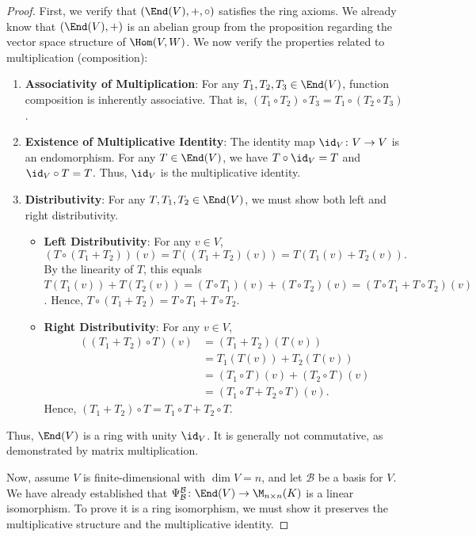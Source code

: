 \begin{proof}
  First, we verify that $(\End(V), +, \circ)$ satisfies the ring axioms. We already know that $(\End(V), +)$ is an abelian group from the proposition regarding the vector space structure of $\Hom(V,W)$. We now verify the properties related to multiplication (composition):
  \begin{enumerate}
    \item \textbf{Associativity of Multiplication}: For any $T_1, T_2, T_3 \in \End(V)$, function composition is inherently associative. That is, $(T_1 \circ T_2) \circ T_3 = T_1 \circ (T_2 \circ T_3)$.
    \item \textbf{Existence of Multiplicative Identity}: The identity map $\id_V \colon V \to V$ is an endomorphism. For any $T \in \End(V)$, we have $T \circ \id_V = T$ and $\id_V \circ T = T$. Thus, $\id_V$ is the multiplicative identity.
    \item \textbf{Distributivity}: For any $T, T_1, T_2 \in \End(V)$, we must show both left and right distributivity.
    \begin{itemize}
      \item \textbf{Left Distributivity}: For any $v \in V$,
      \[ (T \circ (T_1 + T_2))(v) = T((T_1 + T_2)(v)) = T(T_1(v) + T_2(v)). \]
      By the linearity of $T$, this equals $T(T_1(v)) + T(T_2(v)) = (T \circ T_1)(v) + (T \circ T_2)(v) = (T \circ T_1 + T \circ T_2)(v)$.
      Hence, $T \circ (T_1 + T_2) = T \circ T_1 + T \circ T_2$.
      \item \textbf{Right Distributivity}: For any $v \in V$,
      \begin{align*}
        ((T_1 + T_2) \circ T)(v) &= (T_1 + T_2)(T(v)) \\
        &= T_1(T(v)) + T_2(T(v)) \\
        &= (T_1 \circ T)(v) + (T_2 \circ T)(v) \\
        &= (T_1 \circ T + T_2 \circ T)(v).
      \end{align*}
      Hence, $(T_1 + T_2) \circ T = T_1 \circ T + T_2 \circ T$.
    \end{itemize}
  \end{enumerate}
  Thus, $\End(V)$ is a ring with unity $\id_V$. It is generally not commutative, as demonstrated by matrix multiplication.

  Now, assume $V$ is finite-dimensional with $\dim V = n$, and let $\mathcal{B}$ be a basis for $V$. We have already established that $\Psi_{\mathcal{B}}^{\mathcal{B}} \colon \End(V) \to \M_{n \times n}(K)$ is a linear isomorphism. To prove it is a ring isomorphism, we must show it preserves the multiplicative structure and the multiplicative identity.


\end{proof}
